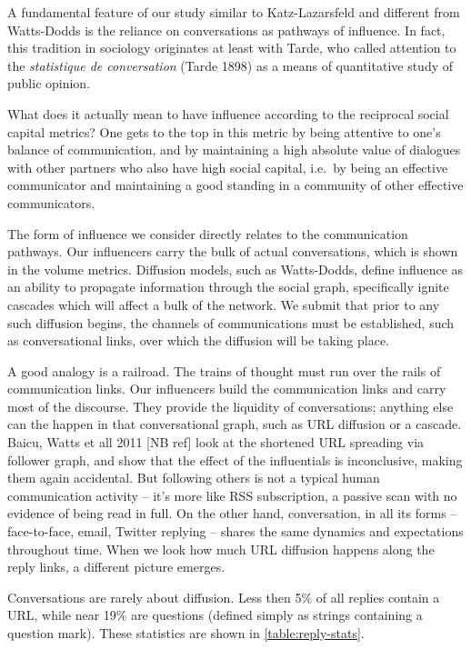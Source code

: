 \documentclass[10pt,oneside]{memoir}
\begin{document}
A fundamental feature of our study similar to Katz-Lazarsfeld and different from Watts-Dodds is the reliance on conversations as pathways of influence.  In fact, this tradition in sociology originates at least with Tarde, who called attention to  the \emph{statistique de conversation} (Tarde 1898) as a means of quantitative study of public opinion.


What does it actually mean to have influence according to the reciprocal social capital metrics?  One gets to the top in this metric by being attentive to one's balance of communication, and by maintaining a high absolute value of dialogues with other partners who also have high social capital, i.e.\ by being an effective communicator and maintaining a good standing in a community of other effective communicators.


The form of influence we consider directly relates to the communication pathways.  Our influencers carry the bulk of actual conversations, which is shown in the volume metrics.  Diffusion models, such as Watts-Dodds, define influence as an ability to propagate information through the social graph, specifically ignite cascades which will affect a bulk of the network.  We submit that prior to any such diffusion begins, the channels of communications must be established, such as conversational links, over which the diffusion will be taking place.


A good analogy is a railroad.  The trains of thought must run over the rails of communication links. Our influencers build the communication links and carry most of the discourse.  They provide the liquidity of conversations; anything else can the happen in that conversational graph, such as URL diffusion or a cascade.   Baicu, Watts et all 2011 [NB ref] look at the shortened URL spreading via follower graph, and show that the effect of the influentials is inconclusive, making them again accidental.  But following others is not a typical human communication activity -- it's more like RSS subscription, a passive scan with no evidence of being read in full.  On the other hand, conversation, in all its forms -- face-to-face, email, Twitter replying -- shares the same dynamics and expectations throughout time.  When we look how much URL diffusion happens along the reply links, a different picture emerges.


Conversations are rarely about diffusion.  Less then 5\% of all replies contain a URL, while near 19\% are questions (defined simply as strings containing a question mark).  These statistics are shown in \ref{table:reply-stats}.
\end{document}

